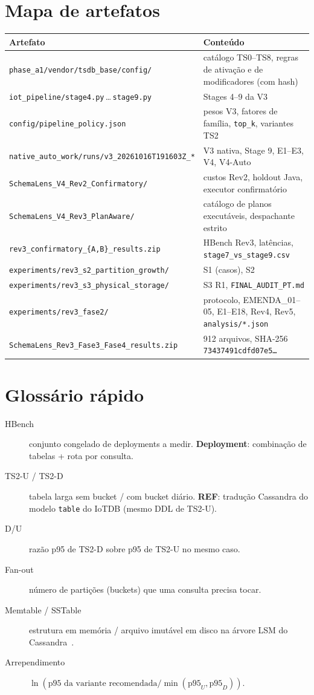 \documentclass[11pt,a4paper]{article}
\begin{document}
\appendix
\section{Mapa de artefatos}
\begin{longtable}{@{}p{5.5cm}p{9cm}@{}}\toprule
\textbf{Artefato} & \textbf{Conteúdo}\\\midrule\endhead
\texttt{phase\_a1/vendor/tsdb\_base/config/} & catálogo TS0--TS8, regras de ativação e de modificadores (com hash)\\
\texttt{iot\_pipeline/stage4.py}\,\ldots\,\texttt{stage9.py} & Stages 4--9 da V3\\
\texttt{config/pipeline\_policy.json} & pesos V3, fatores de família, \texttt{top\_k}, variantes TS2\\
\texttt{native\_auto\_work/runs/v3\_20261016T191603Z\_*} & V3 nativa, Stage 9, E1--E3, V4, V4-Auto\\
\texttt{SchemaLens\_V4\_Rev2\_Confirmatory/} & custos Rev2, holdout Java, executor confirmatório\\
\texttt{SchemaLens\_V4\_Rev3\_PlanAware/} & catálogo de planos executáveis, despachante estrito\\
\texttt{rev3\_confirmatory\_\{A,B\}\_results.zip} & HBench Rev3, latências, \texttt{stage7\_vs\_stage9.csv}\\
\texttt{experiments/rev3\_s2\_partition\_growth/} & S1 (casos), S2\\
\texttt{experiments/rev3\_s3\_physical\_storage/} & S3 R1, \texttt{FINAL\_AUDIT\_PT.md}\\
\texttt{experiments/rev3\_fase2/} & protocolo, EMENDA\_01--05, E1--E18, Rev4, Rev5, \texttt{analysis/*.json}\\
\texttt{SchemaLens\_Rev3\_Fase3\_Fase4\_results.zip} & 912 arquivos, SHA-256 \texttt{73437491cdfd07e5\ldots}\\\bottomrule
\end{longtable}

\section{Glossário rápido}
\begin{description}
\item[HBench] conjunto congelado de deployments a medir. \textbf{Deployment}: combinação de tabelas + rota por consulta.
\item[TS2-U / TS2-D] tabela larga sem bucket / com bucket diário. \textbf{REF}: tradução Cassandra do modelo \texttt{table} do IoTDB (mesmo DDL de TS2-U).
\item[D/U] razão p95 de TS2-D sobre p95 de TS2-U no mesmo caso.
\item[Fan-out] número de partições (buckets) que uma consulta precisa tocar.
\item[Memtable / SSTable] estrutura em memória / arquivo imutável em disco na árvore LSM do Cassandra~\cite{lakshman,lsm}.
\item[Arrependimento] $\ln(\text{p95 da variante recomendada}/\min(\text{p95}_U,\text{p95}_D))$.
\end{description}
\end{document}
